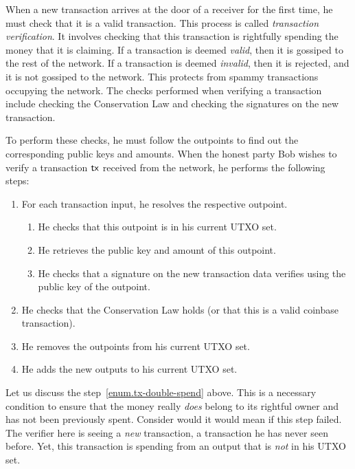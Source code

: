 When a new transaction arrives at the door of a receiver for the first time, he must check that it is
a valid transaction. This process is called \emph{transaction verification}. It involves checking that
this transaction is rightfully spending the money that it is claiming. If a transaction is deemed \emph{valid},
then it is gossiped to the rest of the network. If a transaction is deemed \emph{invalid}, then it is
rejected, and it is not gossiped to the network. This protects from spammy transactions occupying the
network. The checks performed when verifying a transaction include checking the Conservation Law
and checking the signatures on the new transaction.

To perform these checks, he must follow the outpoints to find out the corresponding
public keys and amounts. When the honest party  Bob wishes to verify a transaction $\mathsf{tx}$ received from
the network, he performs the following steps:

\begin{enumerate}
  \item For each transaction input, he resolves the respective outpoint.
  \begin{enumerate}
    \item He checks that this outpoint is in his current UTXO set. \label{enum.tx-double-spend}
    \item He retrieves the public key and amount of this outpoint.
    \item He checks that a signature on the new transaction data verifies using the public key of the outpoint.
  \end{enumerate}
  \item He checks that the Conservation Law holds (or that this is a valid coinbase transaction).
  \item He removes the outpoints from his current UTXO set.
  \item He adds the new outputs to his current UTXO set.
\end{enumerate}

Let us discuss the step~\ref{enum.tx-double-spend} above.
This is a necessary condition to ensure that the money really \emph{does} belong to its rightful owner and
has not been previously spent.
Consider would it would mean if this step failed.
The verifier here is seeing a \emph{new} transaction, a transaction he has never seen before.
Yet, this transaction is spending from an output that is \emph{not} in his UTXO set.

